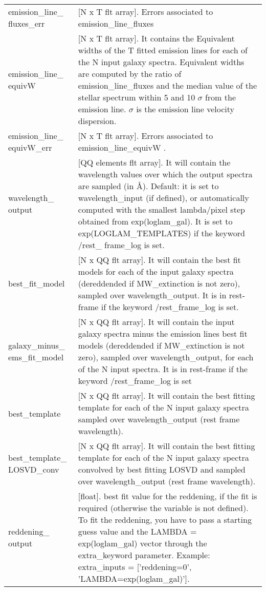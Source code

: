\begin{center}
\begin{longtable}{p{2.7cm}| p{11.1cm}}
%
 emission\_line\_ fluxes\_err &  [N x T flt array].  Errors associated to emission\_line\_fluxes \\
%
 emission\_line\_ equivW      & [N x T flt array]. It contains the Equivalent widths of the T fitted emission lines for each of the N input galaxy spectra.                            Equivalent widths are computed by the ratio of emission\_line\_fluxes and the median value of the stellar spectrum within 5 and 10 $\sigma$ from the emission line. $\sigma$ is the emission line velocity dispersion. \\
%
 emission\_line\_ equivW\_err  & [N x T flt array]. Errors associated to emission\_line\_equivW  . \\
%
 wavelength\_ output     & [QQ elements flt array]. It will contain the wavelength values over which the output spectra are sampled (in \AA). 
                        Default: it is set to wavelength\_input (if defined), or automatically computed with the smallest lambda/pixel step obtained from exp(loglam\_gal). 
                        It is set to exp(LOGLAM\_TEMPLATES) if the keyword /rest\_ frame\_log is set.\\
%
 best\_fit\_model      &[N x QQ flt array]. It will contain the best fit models for each of the input galaxy spectra (dereddended if 
                       MW\_extinction is not zero), sampled over wavelength\_output. It is in rest-frame if the keyword /rest\_frame\_log is set. \\
%
 galaxy\_minus\_ ems\_fit\_model &[N x QQ flt array]. It will contain the input galaxy spectra minus the emission lines best fit models (dereddended if MW\_extinction is not zero), 
                      sampled over wavelength\_output, for each of the N input spectra. It is in rest-frame if the keyword /rest\_frame\_log is set\\
%
 best\_template &[N x QQ flt array]. It will contain the best fitting template for each of the N input galaxy spectra sampled over wavelength\_output (rest frame wavelength). \\
%
 best\_template\_ LOSVD\_conv &[N x QQ flt array]. It will contain the best fitting template for each of the N input galaxy spectra convolved by best fitting 
LOSVD and sampled over wavelength\_output (rest frame wavelength).\\
%
 reddening\_ output &[float]. best fit value for the reddening, if the fit is required (otherwise the variable is not defined). To fit the reddening, you have to pass a 
                        starting guess value and the LAMBDA = exp(loglam\_gal) vector through the extra\_keyword parameter. Example: extra\_inputs = ['reddening=0', 'LAMBDA=exp(loglam\_gal)'].\\

\end{longtable}
\end{center}
